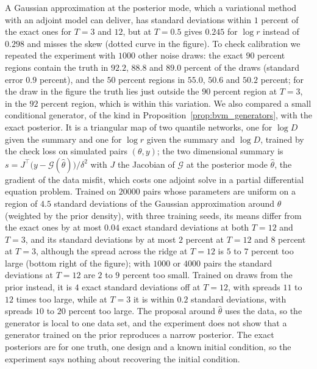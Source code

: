 A Gaussian approximation at the posterior mode, which a variational method with an adjoint model can deliver, has standard deviations within $1$ percent of the exact ones for $T=3$ and $12$, but at $T=0.5$ gives $0.245$ for $\log r$ instead of $0.298$ and misses the skew (dotted curve in the figure). To check calibration we repeated the experiment with $1000$ other noise draws: the exact $90$ percent regions contain the truth in $92.2$, $88.8$ and $89.0$ percent of the draws (standard error $0.9$ percent), and the $50$ percent regions in $55.0$, $50.6$ and $50.2$ percent; for the draw in the figure the truth lies just outside the $90$ percent region at $T=3$, in the $92$ percent region, which is within this variation. We also compared a small conditional generator, of the kind in Proposition~\ref{prop:bvm_generators}, with the exact posterior. It is a triangular map of two quantile networks, one for $\log D$ given the summary and one for $\log r$ given the summary and $\log D$, trained by the check loss on simulated pairs $(\theta,y)$; the two dimensional summary is $s=J^\top\big(y-\mathcal{G}(\hat\theta)\big)/\delta^2$ with $J$ the Jacobian of $\mathcal{G}$ at the posterior mode $\hat\theta$, the gradient of the data misfit, which costs one adjoint solve in a partial differential equation problem. Trained on $20000$ pairs whose parameters are uniform on a region of $4.5$ standard deviations of the Gaussian approximation around $\hat\theta$ (weighted by the prior density), with three training seeds, its means differ from the exact ones by at most $0.04$ exact standard deviations at both $T=12$ and $T=3$, and its standard deviations by at most $2$ percent at $T=12$ and $8$ percent at $T=3$, although the spread across the ridge at $T=12$ is $5$ to $7$ percent too large (bottom right of the figure); with $1000$ or $4000$ pairs the standard deviations at $T=12$ are $2$ to $9$ percent too small. Trained on draws from the prior instead, it is $4$ exact standard deviations off at $T=12$, with spreads $11$ to $12$ times too large, while at $T=3$ it is within $0.2$ standard deviations, with spreads $10$ to $20$ percent too large. The proposal around $\hat\theta$ uses the data, so the generator is local to one data set, and the experiment does not show that a generator trained on the prior reproduces a narrow posterior. The exact posteriors are for one truth, one design and a known initial condition, so the experiment says nothing about recovering the initial condition.


